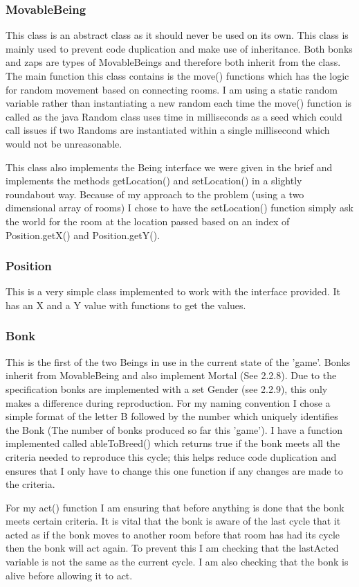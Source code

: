 \documentclass[12pt]{article}
\begin{document}
\subsubsection{MovableBeing}
This class is an abstract class as it should never be used on its own. This class is mainly used to prevent code duplication and make use of inheritance. Both bonks and zaps are types of MovableBeings and therefore both inherit from the class. The main function this class contains is the move() functions which has the logic for random movement based on connecting rooms. I am using a static random variable rather than instantiating a new random each time the move() function is called as the java Random class uses time in milliseconds as a seed which could call issues if two Randoms are instantiated within a single millisecond which would not be unreasonable. 

This class also implements the Being interface we were given in the brief and implements the methods getLocation() and setLocation() in a slightly roundabout way. Because of my approach to the problem (using a two dimensional array of rooms) I chose to have the setLocation() function simply ask the world for the room at the location passed based on an index of Position.getX() and Position.getY().
\subsubsection{Position}
This is a very simple class implemented to work with the interface provided. It has an X and a Y value with functions to get the values.
\subsubsection{Bonk}
This is the first of the two Beings in use in the current state of the 'game'. Bonks inherit from MovableBeing and also implement Mortal (See 2.2.8). Due to the specification bonks are implemented with a set Gender (see 2.2.9), this only makes a difference during reproduction. For my naming convention I chose a simple format of the letter B followed by the number which uniquely identifies the Bonk (The number of bonks produced so far this 'game'). I have a function implemented called ableToBreed() which returns true if the bonk meets all the criteria needed to reproduce this cycle; this helps reduce code duplication and ensures that I only have to change this one function if any changes are made to the criteria.

For my act() function I am ensuring that before anything is done that the bonk meets certain criteria. It is vital that the bonk is aware of the last cycle that it acted as if the bonk moves to another room before that room has had its cycle then the bonk will act again. To prevent this I am checking that the lastActed variable is not the same as the current cycle. I am also checking that the bonk is alive before allowing it to act. 
\end{document}
